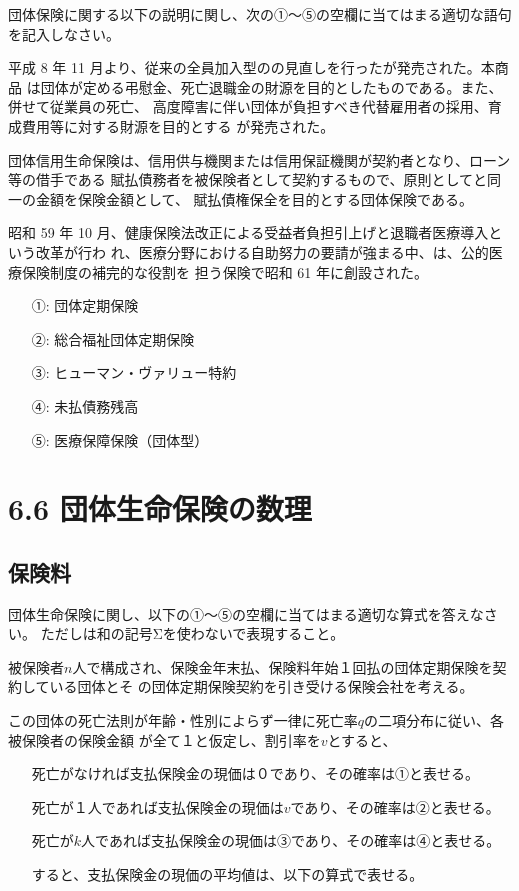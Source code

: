\documentclass[report,gutter=10mm,fore-edge=10mm,uplatex,dvipdfmx]{jlreq}
\begin{document}
団体保険に関する以下の説明に関し、次の①～⑤の空欄に当てはまる適切な語句を記入しなさい。

平成 8 年 11 月より、従来の全員加入型のの見直しを行ったが発売された。本商品
は団体が定める弔慰金、死亡退職金の財源を目的としたものである。また、併せて従業員の死亡、
高度障害に伴い団体が負担すべき代替雇用者の採用、育成費用等に対する財源を目的とする
が発売された。

団体信用生命保険は、信用供与機関または信用保証機関が契約者となり、ローン等の借手である
賦払債務者を被保険者として契約するもので、原則としてと同一の金額を保険金額として、
賦払債権保全を目的とする団体保険である。

昭和 59 年 10 月、健康保険法改正による受益者負担引上げと退職者医療導入という改革が行わ
れ、医療分野における自助努力の要請が強まる中、は、公的医療保険制度の補完的な役割を
担う保険で昭和 61 年に創設された。
\answer{}
\begin{itemize}
\item[ ①: ]  団体定期保険
\item[ ②: ]  総合福祉団体定期保険
\item[ ③: ]  ヒューマン・ヴァリュー特約
\item[ ④: ]  未払債務残高
\item[ ⑤: ]  医療保障保険（団体型）
\end{itemize}
\section{6.6 団体生命保険の数理}
\subsection{保険料}

団体生命保険に関し、以下の①～⑤の空欄に当てはまる適切な算式を答えなさい。
ただしは和の記号Σを使わないで表現すること。

被保険者$n$人で構成され、保険金年末払、保険料年始１回払の団体定期保険を契約している団体とそ
の団体定期保険契約を引き受ける保険会社を考える。

この団体の死亡法則が年齢・性別によらず一律に死亡率$q$の二項分布に従い、各被保険者の保険金額
が全て１と仮定し、割引率を$v$とすると、

\begin{itemize}
\item[] 死亡がなければ支払保険金の現価は０であり、その確率は①と表せる。
\item[] 死亡が１人であれば支払保険金の現価は$v$であり、その確率は②と表せる。
\item[] 死亡が$k$人であれば支払保険金の現価は③であり、その確率は④と表せる。
\item[] すると、支払保険金の現価の平均値は、以下の算式で表せる。
\end{itemize}
\end{document}
